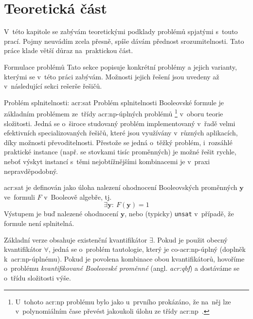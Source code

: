 \documentclass[thesis=M,czech]{FITthesis}[2012/06/26]
\newcommand{\acrlabel}[1]{acr:#1}
\newcommand{\acr}[1]{\acrshort{\acrlabel{#1}}}
\newcommand{\id}[1]{\texttt{#1}}
\newcommand{\hl}[1]{\textit{#1}}
\newcommand{\name}[1]{\hl{#1}}
\newcommand{\cit}[1]{\cite{#1}}
\renewcommand{\vec}[1]{\ensuremath{\boldsymbol{#1}}}
\begin{document}


\chapter{Teoretická část}\label{ch:theory}
V~této kapitole se zabývám
teoretickými podklady problémů spjatými s~touto prací.
Pojmy neuvádím zcela přesně,
spíše dávám přednost srozumitelnosti.
Tato práce klade větší důraz na~praktickou část.


\begin{section}{Formulace problémů}\label{s:theory:formulation}
Tato sekce popisuje konkrétní problémy a jejich varianty,
kterými se v~této práci zabývám.
Možnosti jejich řešení jsou uvedeny až v~následující sekci rešerše řešičů.


\begin{subsection}{Problém splnitelnosti: \acr{sat}}
\label{ss:theory:formulation:sat}
Problém splnitelnosti Booleovské formule
je základním problémem
ze~třídy \acr{np}-úplných problémů%
\footnote{U~tohoto \acr{np} problému
bylo jako u~prvního prokázáno,
že na~něj lze v~polynomiálním čase převést
jakoukoli úlohu ze třídy \acr{np}~\cit{cook-art}.}
v~oboru teorie složitosti.
Jedná se o~široce studovaný problém
implementovaný v~řadě velmi efektivních specializovaných řešičů,
které jsou využívány v~různých aplikacích,
díky možnosti převoditelnosti.
Přestože se jedná o~těžký problém,
i~rozsáhlé praktické instance
(např. se stovkami tisíc proměnných)
je možné řešit rychle,
neboť výskyt instancí s~těmi nejobtížnějšími kombinacemi
je v~praxi nepravděpodobný.

\acr{sat} je definován jako úloha nalezení ohodnocení
Booleovských proměnných \vec{y}
ve~formuli $F$ v~Booleově algebře,
tj.
\begin{equation}\label{eq:sat}
   \exists \vec{y} : \: F(\vec{y}) = 1
\end{equation}
Výstupem je buď nalezené ohodnocení \vec{y},
nebo (typicky) \id{unsat} v~případě, že formule není splnitelná.

Základní verze obsahuje existenční kvantifikátor $\exists$.
Pokud je použit obecný kvantifikátor $\forall$,
jedná se o~problém tautologie, který je co-\acr{np}-úplný
(doplněk k~\acr{np}-úplnému).
Pokud je povolena kombinace obou kvantifikátorů,
hovoříme o~problému \name{kvantifikované Booleovské proměnné}
(angl. \name{\acr{qbf}})
a dostáváme se o~třídu složitosti výše.


\end{subsection}
\end{section}
\end{document}
